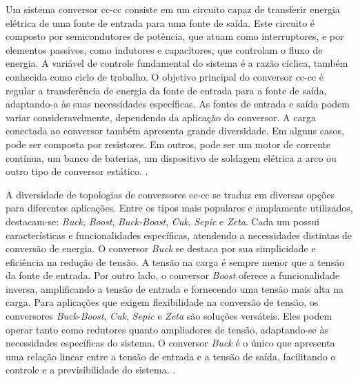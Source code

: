 Um sistema conversor \acrshort{cc}-\acrshort{cc} consiste em um circuito capaz de transferir energia elétrica de uma fonte de entrada para uma fonte de saída. Este circuito é composto por semicondutores de potência, que atuam como interruptores, e por elementos passivos, como indutores e capacitores, que controlam o fluxo de energia. A variável de controle fundamental do sistema é a razão cíclica, também conhecida como ciclo de trabalho. O objetivo principal do conversor \acrshort{cc}-\acrshort{cc} é regular a transferência de energia da fonte de entrada para a fonte de saída, adaptando-a às suas necessidades específicas. As fontes de entrada e saída podem variar consideravelmente, dependendo da aplicação do conversor. A carga conectada ao conversor também apresenta grande diversidade. Em alguns casos, pode ser composta por resistores. Em outros, pode ser um motor de corrente contínua, um banco de baterias, um dispositivo de soldagem elétrica a arco ou outro tipo de conversor estático. \citep{martins2008}.


A diversidade de topologias de conversores \acrshort{cc}-\acrshort{cc} se traduz em diversas opções para diferentes aplicações. Entre os tipos mais populares e amplamente utilizados, destacam-se: \textit{Buck}, \textit{Boost}, \textit{Buck-\textit{Boost}}, \textit{Cuk}, \textit{Sepic} e \textit{Zeta}. Cada um possui características e funcionalidades específicas, atendendo a necessidades distintas de conversão de energia. O conversor \textit{Buck} se destaca por sua simplicidade e eficiência na redução de tensão. A tensão na carga é sempre menor que a tensão da fonte de entrada. Por outro lado, o conversor \textit{Boost} oferece a funcionalidade inversa, amplificando a tensão de entrada e fornecendo uma tensão mais alta na carga. Para aplicações que exigem flexibilidade na conversão de tensão, os conversores \textit{Buck}-\textit{Boost}, \textit{Cuk}, \textit{Sepic} e \textit{Zeta} são soluções versáteis. Eles podem operar tanto como redutores quanto ampliadores de tensão, adaptando-se às necessidades específicas do sistema. O conversor \textit{Buck} é o único que apresenta uma relação linear entre a tensão de entrada e a tensão de saída, facilitando o controle e a previsibilidade do sistema. \citep{martins2008}.

